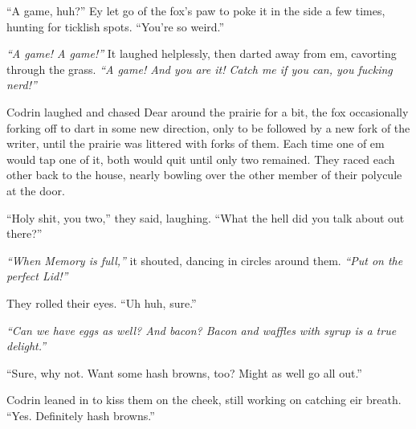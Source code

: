 ``A game, huh?'' Ey let go of the fox's paw to poke it in the side a few times, hunting for ticklish spots. ``You're so weird.''

\emph{``A game! A game!''} It laughed helplessly, then darted away from em, cavorting through the grass. \emph{``A game! And you are it! Catch me if you can, you fucking nerd!''}

Codrin laughed and chased Dear around the prairie for a bit, the fox occasionally forking off to dart in some new direction, only to be followed by a new fork of the writer, until the prairie was littered with forks of them. Each time one of em would tap one of it, both would quit until only two remained. They raced each other back to the house, nearly bowling over the other member of their polycule at the door.

``Holy shit, you two,'' they said, laughing. ``What the hell did you talk about out there?''

\emph{``When Memory is full,''} it shouted, dancing in circles around them. \emph{``Put on the perfect Lid!''}

They rolled their eyes. ``Uh huh, sure.''

\emph{``Can we have eggs as well? And bacon? Bacon and waffles with syrup is a true delight.''}

``Sure, why not. Want some hash browns, too? Might as well go all out.''

Codrin leaned in to kiss them on the cheek, still working on catching eir breath. ``Yes. Definitely hash browns.''
